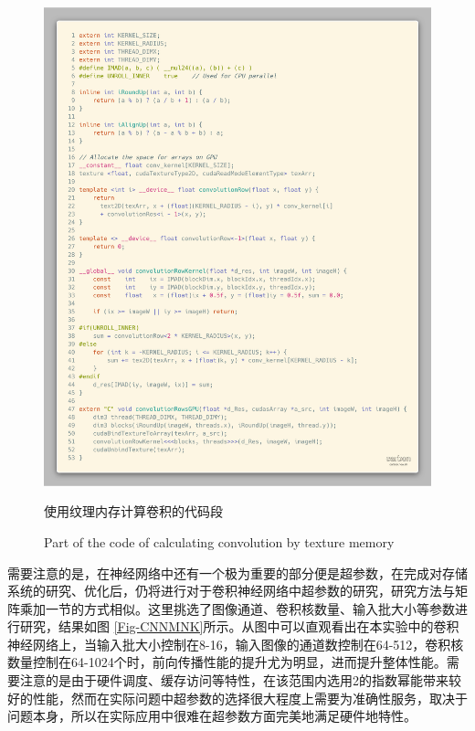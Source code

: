 \begin{figure}
	\centering
	\includegraphics[width=15cm]{figures/TEXSRC.jpg}
	\renewcommand{\thefigure}{\arabic{section}-\arabic{figure} }
	\renewcommand{\figurename}{图}
	\caption{使用纹理内存计算卷积的代码段}
	\addtocounter{figure}{-1}
	\renewcommand{\thefigure}{\arabic{section}-\arabic{figure} }
	\renewcommand{\figurename}{Figure}
	\caption{Part of the code of calculating convolution by texture memory}
	\label{Fig.TexCode}
\end{figure}
\par 需要注意的是，在神经网络中还有一个极为重要的部分便是超参数，在完成对存储系统的研究、优化后，仍将进行对于卷积神经网络中超参数的研究，研究方法与矩阵乘加一节的方式相似。这里挑选了图像通道、卷积核数量、输入批大小等参数进行研究，结果如图 \ref{Fig-CNNMNK}所示。从图中可以直观看出在本实验中的卷积神经网络上，当输入批大小控制在8-16，输入图像的通道数控制在64-512，卷积核数量控制在64-1024个时，前向传播性能的提升尤为明显，进而提升整体性能。需要注意的是由于硬件调度、缓存访问等特性，在该范围内选用2的指数幂能带来较好的性能，然而在实际问题中超参数的选择很大程度上需要为准确性服务，取决于问题本身，所以在实际应用中很难在超参数方面完美地满足硬件地特性。
